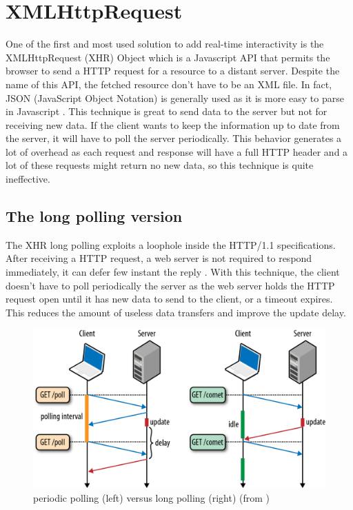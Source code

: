 \documentclass[journal,compsoc]{IEEEtran}
\begin{document}
\section{XMLHttpRequest}

One of the first and most used solution to add real-time interactivity is the XMLHttpRequest (XHR) Object which is a Javascript API that permits the browser to send a HTTP request for a resource to a distant server.
Despite the name of this API, the fetched resource don't have to be an XML file.
In fact, JSON (JavaScript Object Notation) is generally used as it is more easy to parse in Javascript \cite{collinalatency}.
This technique is great to send data to the server but not for receiving new data.
If the client wants to keep the information up to date from the server, it will have to poll the server periodically.
This behavior generates a lot of overhead as each request and response will have a full HTTP header and a lot of these requests might return no new data, so this technique is quite ineffective.

\subsection{The long polling version}

The XHR long polling exploits a loophole inside the \mbox{HTTP/1.1} specifications.
After receiving a HTTP request, a web server is not required to respond immediately, it can defer few instant the reply \cite{collinalatency}.
With this technique, the client doesn't have to poll periodically the server as the web server holds the HTTP request open until it has new data to send to the client, or a timeout expires.
This reduces the amount of useless data transfers and improve the update delay.

\begin{figure}[!ht]
  \centering
  \includegraphics[width=\linewidth]{poll_vs_lpoll}
  \caption{periodic polling (left) versus long polling (right) (from \cite{HighPerfBrowserNetworking:polling})}
  \label{poll_vs_lpoll}
\end{figure}
\end{document}
